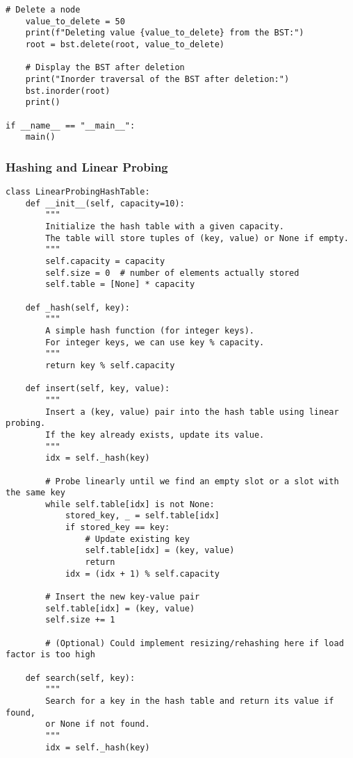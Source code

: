 \documentclass[a4paper,12pt]{article}
\begin{document}
\begin{lstlisting}[style=pythonstyle, caption={Binary Search Tree Operations}]
    # Delete a node
    value_to_delete = 50
    print(f"Deleting value {value_to_delete} from the BST:")
    root = bst.delete(root, value_to_delete)

    # Display the BST after deletion
    print("Inorder traversal of the BST after deletion:")
    bst.inorder(root)
    print()

if __name__ == "__main__":
    main()

\end{lstlisting}

\subsubsection{Hashing and Linear Probing}

\begin{lstlisting}[style=pythonstyle]
class LinearProbingHashTable:
    def __init__(self, capacity=10):
        """
        Initialize the hash table with a given capacity.
        The table will store tuples of (key, value) or None if empty.
        """
        self.capacity = capacity
        self.size = 0  # number of elements actually stored
        self.table = [None] * capacity

    def _hash(self, key):
        """
        A simple hash function (for integer keys).
        For integer keys, we can use key % capacity.
        """
        return key % self.capacity

    def insert(self, key, value):
        """
        Insert a (key, value) pair into the hash table using linear probing.
        If the key already exists, update its value.
        """
        idx = self._hash(key)

        # Probe linearly until we find an empty slot or a slot with the same key
        while self.table[idx] is not None:
            stored_key, _ = self.table[idx]
            if stored_key == key:
                # Update existing key
                self.table[idx] = (key, value)
                return
            idx = (idx + 1) % self.capacity

        # Insert the new key-value pair
        self.table[idx] = (key, value)
        self.size += 1

        # (Optional) Could implement resizing/rehashing here if load factor is too high

    def search(self, key):
        """
        Search for a key in the hash table and return its value if found,
        or None if not found.
        """
        idx = self._hash(key)


\end{lstlisting}
\end{document}
